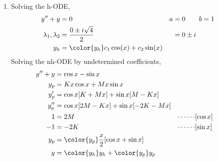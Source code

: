 \begin{enumerate}
    \item Solving the h-ODE,
          \begin{align}
              y'' + y                  & = 0                                         &
              a                        & = 0 \qquad b = 1                              \\
              \lambda_{1}, \lambda_{2} & = \frac{0 \pm i\sqrt{4}}{2}                 &
                                       & = 0 \pm i                                     \\
              y_{h}                    & = {\color{y_h} c_{1}\cos(x) + c_{2}\sin(x)}
          \end{align}
          Solving the nh-ODE by undetermined coefficients,
          \begin{align}
              y'' + y      & = \cos x - \sin x                              \\
              y_{p}        & = Kx\cos x + Mx\sin x                          \\
              y_{p}'       & = \cos x [K + Mx] + \sin x [M - Kx]            \\
              y_{p}''      & = \cos x [2M - Kx] + \sin x [-2K - Mx]         \\
              1            & = 2M                                         &
              \cdots\cdots & [\cos x]                                       \\
              -1           & =  -2K                                       &
              \cdots\cdots & [\sin x]                                       \\
              y_{p}        & = {\color{y_p} \frac{x}{2}[\cos x + \sin x]}   \\
              y            & = {\color{y_h} y_{h}} + {\color{y_p} y_{p}}
          \end{align}


\end{enumerate}
